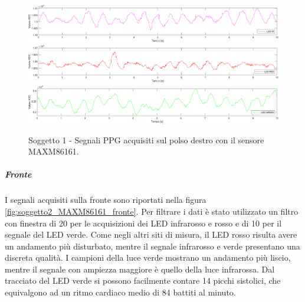 \begin{figure}[h]
	\centering
	\includegraphics[width=1\linewidth]{ImageFiles/Misure Preliminari/Soggetto 1/MAXM86161/polso_ired}
	\includegraphics[width=1\linewidth]{ImageFiles/Misure Preliminari/Soggetto 1/MAXM86161/polso_red}
	\includegraphics[width=1\linewidth]{ImageFiles/Misure Preliminari/Soggetto 1/MAXM86161/polso_green}
	\caption{Soggetto 1 - Segnali PPG acquisiti sul polso destro con il sensore MAXM86161.}
	\label{fig:soggetto1_MAXM86161_polso}
\end{figure}

\clearpage

\subparagraph{Fronte}

I segnali acquisiti sulla fronte sono riportati nella figura \ref{fig:soggetto2_MAXM86161_fronte}. Per filtrare i dati è stato utilizzato un filtro con finestra di 20 per le acquisizioni dei LED infrarosso e rosso e di 10 per il segnale del LED verde. Come negli altri siti di misura, il LED rosso risulta avere un andamento più disturbato, mentre il segnale infrarosso e verde presentano una discreta qualità. I campioni della luce verde mostrano un andamento più liscio, mentre il segnale con ampiezza maggiore è quello della luce infrarossa. Dal tracciato del LED verde si possono facilmente contare 14 picchi sistolici, che equivalgono ad un ritmo cardiaco medio di 84 battiti al minuto.

